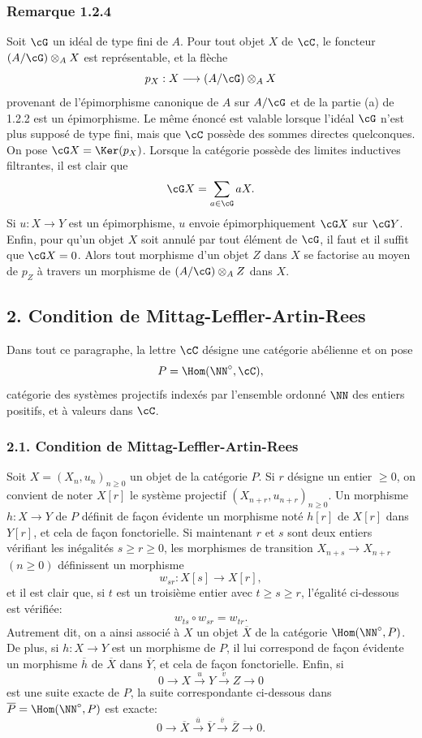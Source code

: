 \subsubsection*{Remarque 1.2.4}
Soit $\cG$ un idéal de type fini de $A$. Pour tout objet $X$ de $\cC$, le foncteur $(A/\cG)\otimes_A X$ est représentable, et la flèche
\[
p_X:X\longrightarrow (A/\cG)\otimes_A X
\]
provenant de l'épimorphisme canonique de $A$ sur $A/\cG$ et de la partie (a) de 1.2.2 est un épimorphisme. Le même énoncé est valable lorsque l'idéal $\cG$ n'est plus supposé de type fini, mais que $\cC$ possède des sommes directes quelconques. On pose $\cG X=\Ker(p_X)$. Lorsque la catégorie possède des limites inductives filtrantes, il est clair que
\[
\cG X=\sum_{a\in\cG}aX.
\]
Si $u:X\to Y$ est un épimorphisme, $u$ envoie épimorphiquement $\cG X$ sur $\cG Y$. Enfin, pour qu'un objet $X$ soit annulé par tout élément de $\cG$, il faut et il suffit que $\cG X=0$. Alors tout morphisme d'un objet $Z$ dans $X$ se factorise au moyen de $p_Z$ à travers un morphisme de $(A/\cG)\otimes_A Z$ dans $X$.

\subsection*{2. Condition de Mittag-Leffler-Artin-Rees}
Dans tout ce paragraphe, la lettre $\cC$ désigne une catégorie abélienne et on pose
\[
P=\Hom(\NN^\circ,\cC),
\]
catégorie des systèmes projectifs indexés par l'ensemble ordonné $\NN$ des entiers positifs, et à valeurs dans $\cC$.

\subsubsection*{2.1. Condition de Mittag-Leffler-Artin-Rees}
Soit $X=(X_n,u_n)_{n\ge0}$ un objet de la catégorie $P$. Si $r$ désigne un entier $\ge0$, on convient de noter $X[r]$ le système projectif $(X_{n+r},u_{n+r})_{n\ge0}$. Un morphisme $h:X\to Y$ de $P$ définit de façon évidente un morphisme noté $h[r]$ de $X[r]$ dans $Y[r]$, et cela de façon fonctorielle. Si maintenant $r$ et $s$ sont deux entiers vérifiant les inégalités $s\ge r\ge0$, les morphismes de transition $X_{n+s}\to X_{n+r}$ $(n\ge0)$ définissent un morphisme
\[
w_{sr}:X[s]\longrightarrow X[r],
\]
et il est clair que, si $t$ est un troisième entier avec $t\ge s\ge r$, l'égalité ci-dessous est
vérifiée:
\[
w_{ts}\circ w_{sr}=w_{tr}.
\]
Autrement dit, on a ainsi associé à $X$ un objet $\overline X$ de la catégorie $\Hom(\NN^\circ,P)$. De plus, si $h:X\to Y$ est un morphisme de $P$, il lui correspond de façon évidente un morphisme $\overline h$ de $\overline X$ dans $\overline Y$, et cela de façon fonctorielle. Enfin, si
\[
0\longrightarrow X\stackrel{u}{\longrightarrow}Y\stackrel{v}{\longrightarrow}Z\longrightarrow0
\]
est une suite exacte de $P$, la suite correspondante ci-dessous dans $\overline P=\Hom(\NN^\circ,P)$ est exacte:
\[
0\longrightarrow\overline X\stackrel{\overline u}{\longrightarrow}\overline Y\stackrel{\overline v}{\longrightarrow}\overline Z\longrightarrow0.
\]

